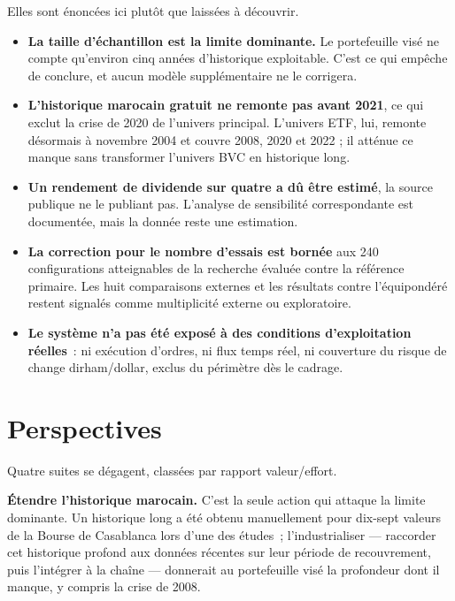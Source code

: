 Elles sont énoncées ici plutôt que laissées à découvrir.

\begin{itemize}
  \item \textbf{La taille d'échantillon est la limite dominante.} Le portefeuille
        visé ne compte qu'environ cinq années d'historique exploitable. C'est ce
        qui empêche de conclure, et aucun modèle supplémentaire ne le corrigera.
  \item \textbf{L'historique marocain gratuit ne remonte pas avant 2021}, ce qui
        exclut la crise de 2020 de l'univers principal. L'univers ETF, lui,
        remonte désormais à novembre 2004 et couvre 2008, 2020 et 2022 ; il
        atténue ce manque sans transformer l'univers BVC en historique long.
  \item \textbf{Un rendement de dividende sur quatre a dû être estimé}, la source
        publique ne le publiant pas. L'analyse de sensibilité correspondante est
        documentée, mais la donnée reste une estimation.
  \item \textbf{La correction pour le nombre d'essais est bornée} aux 240
        configurations atteignables de la recherche évaluée contre la référence
        primaire. Les huit comparaisons externes et les résultats contre
        l'équipondéré restent signalés comme multiplicité externe ou exploratoire.
  \item \textbf{Le système n'a pas été exposé à des conditions d'exploitation
        réelles}~: ni exécution d'ordres, ni flux temps réel, ni couverture du
        risque de change dirham/dollar, exclus du périmètre dès le cadrage.
\end{itemize}

\section*{Perspectives}

Quatre suites se dégagent, classées par rapport valeur/effort.

\textbf{Étendre l'historique marocain.} C'est la seule action qui attaque la
limite dominante. Un historique long a été obtenu manuellement pour dix-sept
valeurs de la Bourse de Casablanca lors d'une des études~; l'industrialiser —
raccorder cet historique profond aux données récentes sur leur période de
recouvrement, puis l'intégrer à la chaîne — donnerait au portefeuille visé la
profondeur dont il manque, y compris la crise de 2008.

